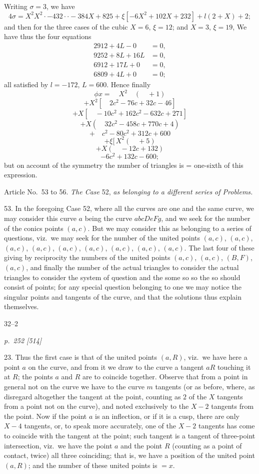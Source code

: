 \documentclass[11pt,a4paper]{book}
\begin{document}
Writing $\sigma = 3$, we have
\[
4\sigma = X^2 X^2 \cdot - 432 \cdot \cdot - 384X + 825 + \xi[-6X^2 + 102X + 232] + l(2 + X) + 2;
\]
and then for the three cases of the cubic $X = 6$, $\xi = 12$; and $X = 3$, $\xi = 19$,
We have thus the four equations
\begin{align*}
2912 + 4L - 0 &= 0, \\
9252 + 8L + 16L &= 0, \\
6912 + 17L + 0 &= 0, \\
6809 + 4L + 0 &= 0;
\end{align*}
all satisfied by $l = -172$, $L = 600$.  Hence finally
\[
\phi x = \quad X^2 \quad ( \quad + 1)
\]
\[
+ X^2[ \quad 2c^2 - 76c + 32c - 46]
\]
\[
+ X[ \quad -10c^2 + 162c^2 - 632c + 271]
\]
\[
+ X (\quad 32c^2 - 458c + 770c + 4)
\]
\[
+ \quad c^2 - 80c^2 + 312c + 600
\]
\[
+ \xi [\, X^2 (\quad + 5)
\]
\[
+ X(\quad - 12c + 132)
\]
\[
- 6c^2 + 132c - 600;
\]
but on account of the symmetry the number of triangles is = one-sixth of this expression.

Article No.~53 to 56.  \textit{The Case} 52, \textit{as belonging to a different series of Problems.}

53.  In the foregoing Case 52, where all the curves are one and the same curve, we may consider this curve $a$ being the curve $abcDeFg$, and we seek for the number of the conics
points $(a, c)$.  But we may consider this as belonging to a series of questions, viz.\ we
may seek for the number of the united points $(a, c)$, $(a, c)$, $(a, c)$, $(a, c)$, $(a, c)$, $(a, c)$, $(a, c)$, $(a, c)$, $(a, c)$.  The
last four of these giving by reciprocity the numbers of the united points $(a, c)$, $(a, c)$,
$(B, F)$, $(a, c)$, and finally the number of the actual triangles to consider the actual
triangles to consider the system of question and the some so so the so should consist
of points; for any special question belonging to one we may notice the singular points and
tangents of the curve, and that the solutions thus explain themselves.

\hfill 32--2

\clearpage

\bigskip
\textit{p.~252 [514]}
\smallskip

23.  Thus the first case is that of the united points $(a, R)$, viz.\ we have here a
point $a$ on the curve, and from it we draw to the curve a tangent $aR$ touching it
at $R$; the points $a$ and $R$ are to coincide together.  Observe that from a point in
general not on the curve we have to the curve $m$ tangents (or as before, where, as
disregard altogether the tangent at the point, counting as $2$ of the $X$ tangents from
a point not on the curve), and noted exclusively to the $X - 2$ tangents from the point.
Now if the point $a$ is an inflection, or if it is a cusp, there are only $X - 4$ tangents,
or, to speak more accurately, one of the $X - 2$ tangents has come to coincide with
the tangent at the point; such tangent is a tangent of three-point intersection, viz.\
we have the point $a$ and the point $R$ (counting as a point of contact, twice) all three
coinciding; that is, we have a position of the united point $(a, R)$; and the number
of these united points is $= x$.
\end{document}
